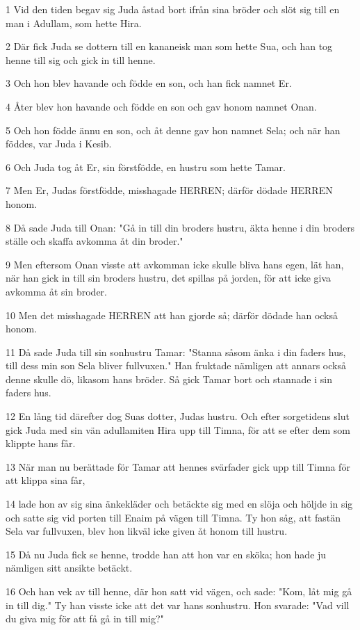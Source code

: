 \par 1 Vid den tiden begav sig Juda åstad bort ifrån sina bröder och slöt sig till en man i Adullam, som hette Hira.
\par 2 Där fick Juda se dottern till en kananeisk man som hette Sua, och han tog henne till sig och gick in till henne.
\par 3 Och hon blev havande och födde en son, och han fick namnet Er.
\par 4 Åter blev hon havande och födde en son och gav honom namnet Onan.
\par 5 Och hon födde ännu en son, och åt denne gav hon namnet Sela; och när han föddes, var Juda i Kesib.
\par 6 Och Juda tog åt Er, sin förstfödde, en hustru som hette Tamar.
\par 7 Men Er, Judas förstfödde, misshagade HERREN; därför dödade HERREN honom.
\par 8 Då sade Juda till Onan: "Gå in till din broders hustru, äkta henne i din broders ställe och skaffa avkomma åt din broder."
\par 9 Men eftersom Onan visste att avkomman icke skulle bliva hans egen, lät han, när han gick in till sin broders hustru, det spillas på jorden, för att icke giva avkomma åt sin broder.
\par 10 Men det misshagade HERREN att han gjorde så; därför dödade han också honom.
\par 11 Då sade Juda till sin sonhustru Tamar: "Stanna såsom änka i din faders hus, till dess min son Sela bliver fullvuxen." Han fruktade nämligen att annars också denne skulle dö, likasom hans bröder. Så gick Tamar bort och stannade i sin faders hus.
\par 12 En lång tid därefter dog Suas dotter, Judas hustru. Och efter sorgetidens slut gick Juda med sin vän adullamiten Hira upp till Timna, för att se efter dem som klippte hans får.
\par 13 När man nu berättade för Tamar att hennes svärfader gick upp till Timna för att klippa sina får,
\par 14 lade hon av sig sina änkekläder och betäckte sig med en slöja och höljde in sig och satte sig vid porten till Enaim på vägen till Timna. Ty hon såg, att fastän Sela var fullvuxen, blev hon likväl icke given åt honom till hustru.
\par 15 Då nu Juda fick se henne, trodde han att hon var en sköka; hon hade ju nämligen sitt ansikte betäckt.
\par 16 Och han vek av till henne, där hon satt vid vägen, och sade: "Kom, låt mig gå in till dig." Ty han visste icke att det var hans sonhustru. Hon svarade: "Vad vill du giva mig för att få gå in till mig?"
